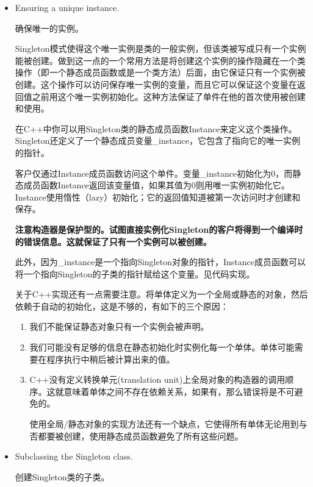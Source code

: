 \begin{itemize}

\item Ensuring a unique instance.

      确保唯一的实例。

	  Singleton模式使得这个唯一实例是类的一般实例，但该类被写成只有一个实例能被创建。做到这一点的一个常用方法是将创建这个实例的操作隐藏在一个类操作（即一个静态成员函数或是一个类方法）后面，由它保证只有一个实例被创建。这个操作可以访问保存唯一实例的变量，而且它可以保证这个变量在返回值之前用这个唯一实例初始化。这种方法保证了单件在他的首次使用被创建和使用。

	  在C++中你可以用Singleton类的静态成员函数Instance来定义这个类操作。Singleton还定义了一个静态成员变量_instance，它包含了指向它的唯一实例的指针。

	  客户仅通过Instance成员函数访问这个单件。变量_instance初始化为0，而静态成员函数Instance返回该变量值，如果其值为0则用唯一实例初始化它。Instance使用惰性（lazy）初始化；它的返回值知道被第一次访问时才创建和保存。

	  \textbf{注意构造器是保护型的。试图直接实例化Singleton的客户将得到一个编译时的错误信息。这就保证了只有一个实例可以被创建。}

	  此外，因为_instance是一个指向Singleton对象的指针，Instance成员函数可以将一个指向Singleton的子类的指针赋给这个变量。见代码实现。

	  关于C++实现还有一点需要注意。将单体定义为一个全局或静态的对象，然后依赖于自动的初始化，这是不够的，有如下的三个原因：

	  \begin{enumerate}
	  \item 我们不能保证静态对象只有一个实例会被声明。

	  \item 我们可能没有足够的信息在静态初始化时实例化每一个单体。单体可能需要在程序执行中稍后被计算出来的值。

	  \item C++没有定义转换单元(translation unit)上全局对象的构造器的调用顺序。这就意味着单体之间不存在依赖关系，如果有，那么错误将是不可避免的。

	  使用全局/静态对象的实现方法还有一个缺点，它使得所有单体无论用到与否都要被创建，使用静态成员函数避免了所有这些问题。
	  \end{enumerate}

\item Subclassing the Singleton class.

	  创建Singleton类的子类。


\end{itemize}
